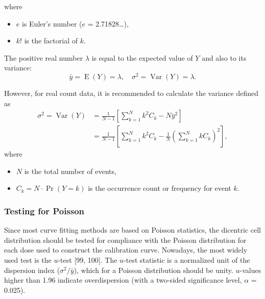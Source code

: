 \documentclass[]{scrartcl}
\providecommand{\tightlist}{%
  \setlength{\itemsep}{0pt}\setlength{\parskip}{0pt}}
\begin{document}
where

\begin{itemize}
\tightlist
\item
  \(e\) is Euler's number (\(e\) = 2.71828\ldots),
\item
  \(k\)! is the factorial of \(k\).
\end{itemize}

The positive real number \(\lambda\) is equal to the expected value of \(Y\) and also to its variance:
\begin{equation}
    \bar{y} = \operatorname{E}(Y) = \lambda, \quad \sigma^{2} = \operatorname{Var}(Y) = \lambda.
    \label{eq:variance-poisson}
\end{equation}

However, for real count data, it is recommended to calculate the variance defined as
\begin{equation}
\begin{aligned}
  \sigma^{2} = \operatorname{Var}(Y)
  &= \frac{1}{N - 1} \left[ \sum_{k=1}^{N} k^{2} C_{k} - N \bar{y}^{2} \right] \\
  &= \frac{1}{N - 1} \left[  \sum_{k=1}^{N} k^{2} C_{k} - \frac{1}{N} \left( \sum_{k=1}^{N} k C_{k} \right)^{2} \right]
  ,
\end{aligned}
  \label{eq:variance}
\end{equation}
where

\begin{itemize}
\tightlist
\item
  \(N\) is the total number of events,
\item
  \(C_{k} = N \cdot \Pr(Y = k)\) is the occurrence count or frequency for event \(k\).
\end{itemize}

\hypertarget{testing-for-poisson}{%
\subsubsection{Testing for Poisson}\label{testing-for-poisson}}

Since most curve fitting methods are based on Poisson statistics, the dicentric cell distribution should be tested for compliance with the Poisson distribution for each dose used to construct the calibration curve. Nowadays, the most widely used test is the \(u\)-test {[}99, 100{]}. The \(u\)-test statistic is a normalized unit of the dispersion index (\(\sigma^{2}/\bar{y}\)), which for a Poisson distribution should be unity. \(u\)-values higher than 1.96 indicate overdispersion (with a two-sided significance level, \(\alpha\) = 0.025).
\end{document}
